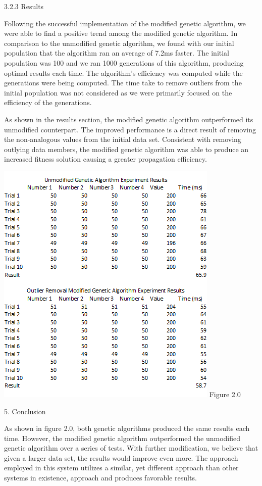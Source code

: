 \documentclass[conference]{IEEEtran}
\begin{document}
3.2.3 Results

Following the successful implementation of the modified genetic algorithm, we were able to find a positive trend among the modified genetic algorithm. In comparison to the unmodified genetic algorithm, we found with our initial population that the algorithm ran an average of 7.2ms faster. The initial population was 100 and we ran 1000 generations of this algorithm, producing optimal results each time. The algorithm's efficiency was computed while the generations were being computed. The time take to remove outliers from the initial population was not considered as we were primarily focused on the efficiency of the generations. 

As shown in the results section, the modified genetic algorithm outperformed its unmodified counterpart. The improved performance is a direct result of removing the non-analogous values from the initial data set. Consistent with removing outlying data members, the modified genetic algorithm was able to produce an increased fitness solution causing a greater propagation efficiency.

\includegraphics[scale=0.8]{GA}
Figure 2.0

\large 5. Conclusion

As shown in figure 2.0, both genetic algorithms produced the same results each time. However, the modified genetic algorithm outperformed the unmodified genetic algorithm over a series of tests. With further modification, we believe that given a larger data set, the results would improve even more. The approach employed in this system utilizes a similar, yet different approach than other systems in existence, approach and produces favorable results. 
\end{document}
